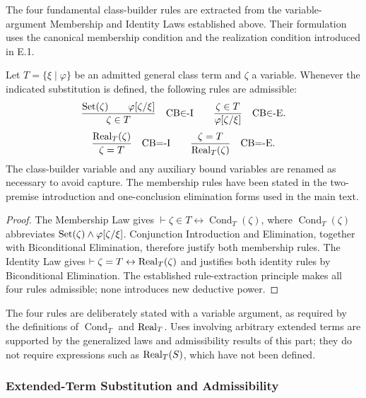 
The four fundamental class-builder rules are extracted from the
variable-argument Membership and Identity Laws established above. Their formulation uses the canonical membership condition
and the realization condition introduced in E.1. 

\begin{metatheorem}
\label{meta:derived-class-builder-rules}
Let \(T=\{\xi\mid\varphi\}\) be an admitted general class term
and \(\zeta\) a variable. Whenever the indicated substitution is
defined, the following rules are admissible:
\[
\frac{\operatorname{Set}(\zeta)\qquad\varphi[\zeta/\xi]}
{\zeta\in T}
\quad\mathrm{CB}{\in}\text{-I}
\qquad
\frac{\zeta\in T}
{\varphi[\zeta/\xi]}
\quad\mathrm{CB}{\in}\text{-E}.
\]
\[
\frac{\operatorname{Real}_T(\zeta)}
{\zeta=T}
\quad\mathrm{CB}{=}\text{-I}
\qquad
\frac{\zeta=T}
{\operatorname{Real}_T(\zeta)}
\quad\mathrm{CB}{=}\text{-E}.
\]
The class-builder variable and any auxiliary bound variables are
renamed as necessary to avoid capture. The membership rules have
been stated in the two-premise introduction and one-conclusion
elimination forms used in the main text.
\end{metatheorem}

\begin{proof}
The Membership Law gives
\(\vdash\zeta\in T\leftrightarrow
\operatorname{Cond}_T(\zeta)\), where
\(\operatorname{Cond}_T(\zeta)\) abbreviates
\(\operatorname{Set}(\zeta)\land\varphi[\zeta/\xi]\).
Conjunction Introduction and Elimination, together with
Biconditional Elimination, therefore justify both membership
rules. The Identity Law gives
\(\vdash\zeta=T\leftrightarrow\operatorname{Real}_T(\zeta)\)
and justifies both identity rules by Biconditional Elimination.
The established rule-extraction principle makes all four rules
admissible; none introduces new deductive power.
\end{proof}

The four rules are deliberately stated with a variable argument,
as required by the definitions of \(\operatorname{Cond}_T\) and
\(\operatorname{Real}_T\). Uses involving arbitrary extended terms are supported
by the generalized laws and admissibility results of this part;
they do not require expressions such as \(\operatorname{Real}_T(S)\), which have
not been defined.




\subsubsection{Extended-Term Substitution and Admissibility}
\label{sec:extended-term-substitution}

